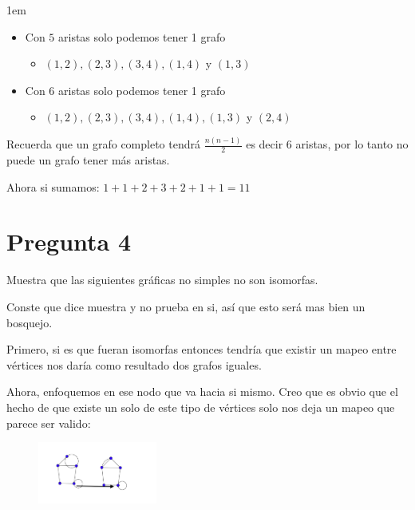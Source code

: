 \documentclass[12pt, fleqn]{article}                            %
\newenvironment{SmallIndentation}[1][0.75em]                    %
        {\begin{adjustwidth}{#1}{}\begin{footnotesize}}             %
        {\end{footnotesize}\end{adjustwidth}}                       %
\theoremstyle{break}                                            %
\begin{document}
\begin{SmallIndentation}[1em]
\begin{itemize}
                \item Con $5$ aristas solo podemos tener 1 grafo \\
                    \begin{itemize}
                        \item $(1,2), (2,3), (3,4), (1,4)$ y $(1,3)$
                    \end{itemize}

                \item Con $6$ aristas solo podemos tener 1 grafo \\
                    \begin{itemize}
                        \item $(1,2), (2,3), (3,4), (1,4), (1,3)$ y $(2,4)$
                    \end{itemize}
            \end{itemize}

            Recuerda que un grafo completo tendrá $\frac{n(n-1)}{2}$ es decir $6$ aristas, por lo
            tanto no puede un grafo tener más aristas.

            Ahora si sumamos: $1+1+2+3+2+1+1 = 11$
        

    \end{SmallIndentation}



\clearpage
\section{Pregunta 4}

    Muestra que las siguientes gráficas no simples no son isomorfas.

    Conste que dice muestra y no prueba en si, así que esto será mas bien un bosquejo.

    Primero, si es que fueran isomorfas entonces tendría que existir un mapeo entre vértices
    nos daría como resultado dos grafos iguales.

    Ahora, enfoquemos en ese nodo que va hacia si mismo.
    Creo que es obvio que el hecho de que existe un solo de este tipo de vértices solo nos deja un mapeo que parece
    ser valido:

    \begin{figure}[h]
        \centering
        \includegraphics[width=0.35\textwidth]{Question41}
    \end{figure}
\end{document}
